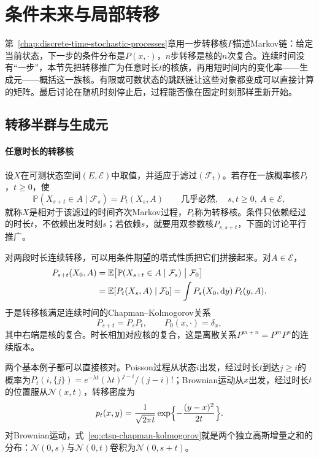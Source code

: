 \section{条件未来与局部转移}
\label{sec:ctsp-markov}

第~\ref{chap:discrete-time-stochastic-processes}章用一步转移核$P$描述Markov链：给定当前状态，下一步的条件分布是$P(x,\cdot)$，$n$步转移是核的$n$次复合。连续时间没有“一步”，本节先把转移推广为任意时长$t$的核族，再用短时间内的变化率——生成元——概括这一族核。有限或可数状态的跳跃链让这些对象都变成可以直接计算的矩阵。最后讨论在随机时刻停止后，过程能否像在固定时刻那样重新开始。

\subsection{转移半群与生成元}
\label{sec:ctsp-semigroup}

\paragraph{任意时长的转移核}
设$X$在可测状态空间$(E,\mathcal E)$中取值，并适应于滤过$(\mathcal F_t)$。若存在一族概率核$P_t$，$t\geq0$，使
\begin{equation}
  \mathbb P(X_{s+t}\in A\mid\mathcal F_s)=P_t(X_s,A)\qquad\text{几乎必然},\quad s,t\geq0,\ A\in\mathcal E,
  \label{eq:ctsp-markov-property}
\end{equation}
就称$X$是相对于该滤过的时间齐次Markov过程，$P_t$称为转移核。条件只依赖经过的时长$t$，不依赖出发时刻$s$；若依赖$s$，就要用双参数核$P_{s,s+t}$，下面的讨论平行推广。

对两段时长连续转移，可以用条件期望的塔式性质把它们拼接起来。对$A\in\mathcal E$，
\[
  \begin{aligned}
    P_{s+t}(X_0,A)&=\mathbb E\bigl[\mathbb P(X_{s+t}\in A\mid\mathcal F_s)\bigm|\mathcal F_0\bigr]\\
    &=\mathbb E[P_t(X_s,A)\mid\mathcal F_0]=\int P_s(X_0,\mathrm dy)\,P_t(y,A).
  \end{aligned}
\]
于是转移核满足连续时间的Chapman--Kolmogorov关系
\begin{equation}
  P_{s+t}=P_sP_t,\qquad P_0(x,\cdot)=\delta_x ,
  \label{eq:ctsp-chapman-kolmogorov}
\end{equation}
其中右端是核的复合。时长相加对应核的复合，这是离散关系$P^{m+n}=P^mP^n$的连续版本。

两个基本例子都可以直接核对。Poisson过程从状态$i$出发，经过时长$t$到达$j\geq i$的概率为$P_t(i,\{j\})=e^{-\lambda t}(\lambda t)^{j-i}/(j-i)!$；Brownian运动从$x$出发，经过时长$t$的位置服从$\mathcal N(x,t)$，转移密度为
\begin{equation}
  p_t(x,y)=\frac1{\sqrt{2\pi t}}\exp\Bigl\{-\frac{(y-x)^2}{2t}\Bigr\}.
  \label{eq:ctsp-heat-kernel}
\end{equation}
对Brownian运动，式~\eqref{eq:ctsp-chapman-kolmogorov}就是两个独立高斯增量之和的分布：$\mathcal N(0,s)$与$\mathcal N(0,t)$卷积为$\mathcal N(0,s+t)$。

